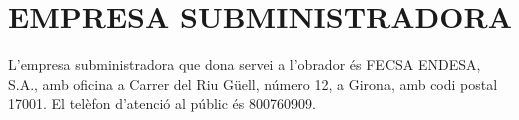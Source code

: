 \chapter{\uppercase{Empresa subministradora}}
L'empresa subministradora que dona servei a l'obrador és FECSA ENDESA, S.A., amb oficina a Carrer del Riu Güell, número 12, a Girona, amb codi postal 17001. El telèfon d'atenció al públic és 800760909.
\clearpage